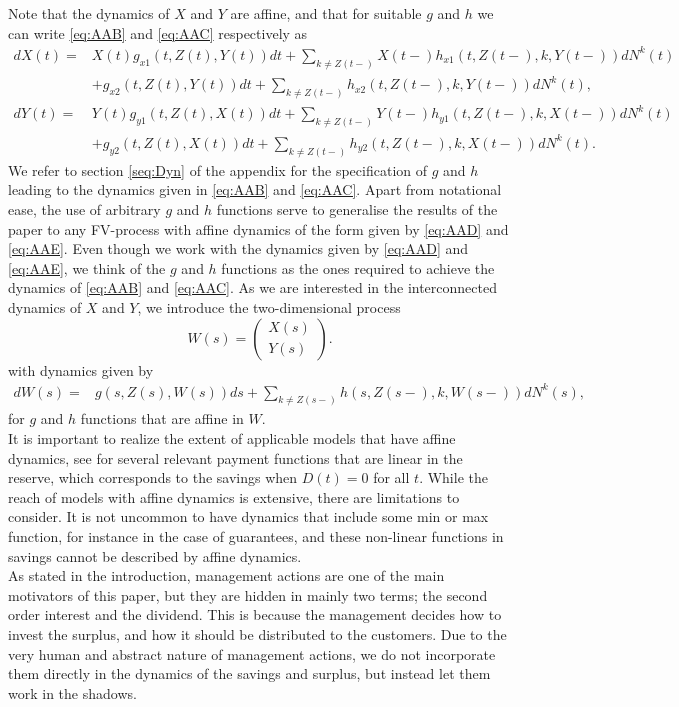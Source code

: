 \documentclass[12pt]{article}
\theoremstyle{my_thm}
\begin{document}
Note that the dynamics of $X$ and $Y$ are affine, and that for suitable $g$ and $h$ we can write \eqref{eq:AAB} and \eqref{eq:AAC} respectively as
\begin{align}
dX(t)=&X(t)g_{x1}(t,Z(t),Y(t))dt + \sum_{k \neq Z(t-)} X(t-) h_{x1}(t,Z(t-),k,Y(t-)) dN^k(t) \nonumber \\
&+g_{x2}(t,Z(t),Y(t))dt + \sum_{k \neq Z(t-)} h_{x2}(t,Z(t-),k,Y(t-)) dN^k(t),
\label{eq:AAD} \\
dY(t)=&Y(t)g_{y1}(t,Z(t),X(t))dt + \sum_{k \neq Z(t-)} Y(t-) h_{y1}(t,Z(t-),k,X(t-)) dN^k(t)
\nonumber \\
&+g_{y2}(t,Z(t),X(t))dt + \sum_{k \neq Z(t-)} h_{y2}(t,Z(t-),k,X(t-)) dN^k(t) \label{eq:AAE}.
\end{align}
We refer to section \ref{seq:Dyn} of the appendix for the specification of $g$ and $h$ leading to the dynamics given in \eqref{eq:AAB} and \eqref{eq:AAC}. Apart from notational ease, the use of arbitrary $g$ and $h$ functions serve to generalise the results of the paper to any FV-process with affine dynamics of the form given by \eqref{eq:AAD} and \eqref{eq:AAE}. Even though we work with the dynamics given by \eqref{eq:AAD} and \eqref{eq:AAE}, we think of the $g$ and $h$ functions as the ones required to achieve the dynamics of \eqref{eq:AAB} and \eqref{eq:AAC}. As we are interested in the interconnected dynamics of $X$ and $Y$, we introduce the two-dimensional process 
$$
W(s)= \begin{pmatrix}
X(s)\\
Y(s)
\end{pmatrix}.
$$
with dynamics given by
\begin{align*}
dW(s)=& g(s,Z(s),W(s)) ds+ \sum_{k\neq Z(s-)} h(s,Z(s-),k,W(s-)) dN^k(s),
\end{align*}
for $g$ and $h$ functions that are affine in $W$.
\\[12pt]
It is important to realize the extent of applicable models that have affine dynamics, see \citet{Christiansen} for several relevant payment functions that are linear in the reserve, which corresponds to the savings when $D(t)=0$ for all $t$. While the reach of models with affine dynamics is extensive, there are limitations to consider. It is not uncommon to have dynamics that include some min or max function, for instance in the case of guarantees, and these non-linear functions in savings cannot be described by affine dynamics. \\
As stated in the introduction, management actions are one of the main motivators of this paper, but they are hidden in mainly two terms; the second order interest and the dividend. This is because the management decides how to invest the surplus, and how it should be distributed to the customers. Due to the very human and abstract nature of management actions, we do not incorporate them directly in the dynamics of the savings and surplus, but instead let them work in the shadows.
\end{document}
